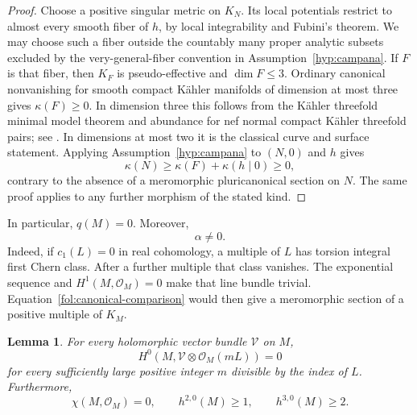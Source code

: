 \documentclass[11pt,letterpaper]{article}
\newcommand{\OO}{\mathcal{O}}
\newtheorem{lemma}[theorem]{Lemma}
\theoremstyle{definition}
\theoremstyle{remark}
\begin{document}
\begin{proof}
Choose a positive singular metric on $K_N$.  Its local potentials restrict
to almost every smooth fiber of $h$, by local integrability and Fubini's
theorem.  We may choose such a fiber outside the countably many proper
analytic subsets excluded by the very-general-fiber convention in
Assumption~\ref{hyp:campana}.  If $F$ is that fiber, then $K_F$ is
pseudo-effective and $\dim F\leq3$.  Ordinary canonical nonvanishing for
smooth compact K\"ahler manifolds of dimension at most three gives
$\kappa(F)\geq0$.  In dimension three this follows from the K\"ahler
threefold minimal model theorem and abundance for nef normal compact
K\"ahler threefold pairs; see
\cite{HPMinimalModels,DasOuAbundanceII}.  In dimensions at most two it is
the classical curve and surface statement.  Applying
Assumption~\ref{hyp:campana} to $(N,0)$ and $h$ gives
\[
 \kappa(N)\geq\kappa(F)+\kappa(h\mid0)\geq0,
\]
contrary to the absence of a meromorphic pluricanonical section on $N$.
The same proof applies to any further morphism of the stated kind.
\end{proof}

In particular, $q(M)=0$.  Moreover,
\begin{equation}\label{fol:nonzero-alpha}
 \alpha\ne0.
\end{equation}
Indeed, if $c_1(L)=0$ in real cohomology, a multiple of $L$ has torsion
integral first Chern class.  After a further multiple that class vanishes.
The exponential sequence and $H^1(M,\OO_M)=0$ make that line bundle
trivial.  Equation~\eqref{fol:canonical-comparison} would then give a
meromorphic section of a positive multiple of $K_M$.

\begin{lemma}\label{fol:eventual-vanishing}
For every holomorphic vector bundle $\mathcal V$ on $M$,
\[
 H^0(M,\mathcal V\otimes\OO_M(mL))=0
\]
for every sufficiently large positive integer $m$ divisible by the index
of $L$.  Furthermore,
\begin{equation}\label{fol:forms-dimensions}
 \chi(M,\OO_M)=0,\qquad h^{2,0}(M)\geq1,\qquad h^{3,0}(M)\geq2.
\end{equation}
\end{lemma}
\end{document}
